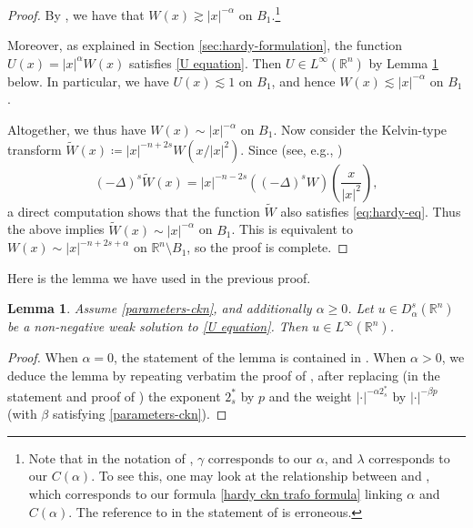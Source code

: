 \documentclass[10pt, reqno]{amsart}
\newcounter{results}[section] %
\theoremstyle{plain}
\newtheorem{lemma}[results]{Lemma}
\theoremstyle{remark}
\theoremstyle{definition}
\numberwithin{equation}{section}
\theoremstyle{plain}
\newcommand{\R}{\ensuremath{\mathbb R}} %
\newcommand{\defeq}{\ensuremath{\coloneqq}}%
\begin{document}
\begin{proof}
By \cite[Lemma 3.10]{Abdellaoui2016}, we have that $W(x) \gtrsim |x|^{-\alpha}$ on $B_1$.\footnote{Note that in the notation of \cite{Abdellaoui2016}, $\gamma$ corresponds to our $\alpha$, and $\lambda$ corresponds to our $C(\alpha)$. To see this, one may look at the relationship between \cite[eq. (6)]{Abdellaoui2016} and \cite[eq. (21)]{Abdellaoui2016}, which corresponds to our formula \cref{hardy ckn trafo formula} linking $\alpha$ and $C(\alpha)$. The reference to \cite[eq. (19)]{Abdellaoui2016} in the statement of \cite[Lemma 3.10]{Abdellaoui2016} is erroneous.}

Moreover, as explained in Section \ref{sec:hardy-formulation}, the function $U(x) = |x|^{\alpha} W(x)$ satisfies \cref{U equation}. Then $U \in L^\infty(\R^n)$ by Lemma \ref{lemma Dipierro} below.  In particular, we have $U(x) \lesssim 1$ on $B_1$, and hence $W(x) \lesssim |x|^{-\alpha}$ on $B_1$. 

Altogether, we thus have $W(x) \sim |x|^{-\alpha}$ on $B_1$. Now consider the Kelvin-type transform $\tilde W(x) \defeq |x|^{-n + 2s} W(x/|x|^2)$. Since (see, e.g., \cite[Proposition 3.2]{MR3888401})
\[ (-\Delta)^s \tilde W(x) = |x|^{-n-2s} ((-\Delta)^s W)(\frac{x}{|x|^2}), \]
a direct computation shows that the function $\tilde W$ also satisfies \cref{eq:hardy-eq}. Thus the above implies $\tilde W(x) \sim |x|^{-\alpha}$ on $B_1$. This is equivalent to $W(x) \sim |x|^{-n + 2s + \alpha}$ on $\R^n \setminus B_1$, so the proof is complete. 
\end{proof}

Here is the lemma we have used in the previous proof. 

\begin{lemma}
    \label{lemma Dipierro}
    Assume \eqref{parameters-ckn}, and additionally $\alpha \geq 0$. Let $u \in D^s_\alpha(\R^n)$ be a non-negative weak solution to 
    \cref{U equation}. Then $u \in L^\infty(\R^n)$. 
\end{lemma}

\begin{proof}
    When $\alpha = 0$, the statement of the lemma is contained in \cite[Theorem 1.1]{MusinaNazarov2021}. When $\alpha > 0$, we deduce the lemma by repeating verbatim the proof of \cite[Proposition 4.5]{Dipierro2016}, after replacing (in the statement and proof of \cite[Proposition 4.5]{Dipierro2016}) the exponent $2^*_s$ by $p$ and the weight $|\cdot|^{-\alpha 2^*_s}$ by $|\cdot|^{-\beta p}$ (with $\beta$ satisfying \cref{parameters-ckn}). 
\end{proof}
\end{document}
